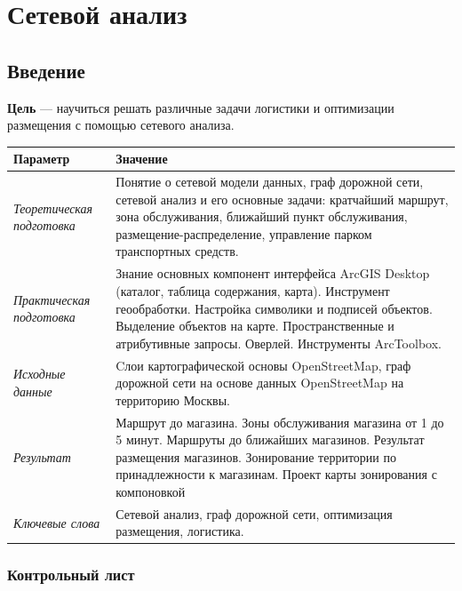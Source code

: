 \documentclass[]{book}
\theoremstyle{definition}
\theoremstyle{definition}
\theoremstyle{definition}
\theoremstyle{remark}
\begin{document}
\hypertarget{network-analysis}{%
\chapter{Сетевой анализ}\label{network-analysis}}

\hypertarget{network-analysis-intro}{%
\section{Введение}\label{network-analysis-intro}}

\textbf{Цель} --- научиться решать различные задачи логистики и
оптимизации размещения с помощью сетевого анализа.

\begin{longtable}[]{@{}ll@{}}
\toprule
Параметр & Значение\tabularnewline
\midrule
\endhead
\emph{Теоретическая подготовка} & Понятие о сетевой модели данных, граф
дорожной сети, сетевой анализ и его основные задачи: кратчайший маршрут,
зона обслуживания, ближайший пункт обслуживания,
размещение-распределение, управление парком транспортных
средств.\tabularnewline
\emph{Практическая подготовка} & Знание основных компонент интерфейса
ArcGIS Desktop (каталог, таблица содержания, карта). Инструмент
геообработки. Настройка символики и подписей объектов. Выделение
объектов на карте. Пространственные и атрибутивные запросы. Оверлей.
Инструменты ArcToolbox.\tabularnewline
\emph{Исходные данные} & Cлои картографической основы OpenStreetMap,
граф дорожной сети на основе данных OpenStreetMap на территорию
Москвы.\tabularnewline
\emph{Результат} & Маршрут до магазина. Зоны обслуживания магазина от 1
до 5 минут. Маршруты до ближайших магазинов. Результат размещения
магазинов. Зонирование территории по принадлежности к магазинам. Проект
карты зонирования с компоновкой\tabularnewline
\emph{Ключевые слова} & Сетевой анализ, граф дорожной сети, оптимизация
размещения, логистика.\tabularnewline
\bottomrule
\end{longtable}

\hypertarget{network-analysis-control}{%
\subsection{Контрольный лист}\label{network-analysis-control}}
\end{document}
